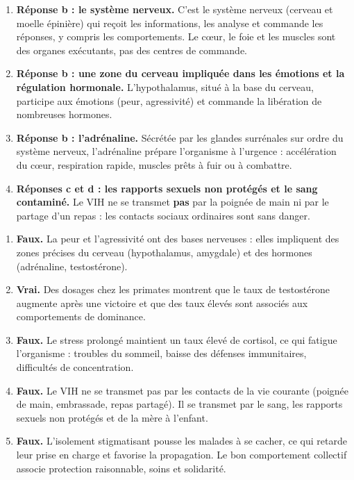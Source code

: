 \documentclass[11pt]{article}
\begin{document}
\begin{corrige}
\begin{enumerate}
\item \textbf{Réponse b : le système nerveux.} C'est le système nerveux (cerveau et moelle épinière) qui reçoit les informations, les analyse et commande les réponses, y compris les comportements. Le cœur, le foie et les muscles sont des organes exécutants, pas des centres de commande.
\item \textbf{Réponse b : une zone du cerveau impliquée dans les émotions et la régulation hormonale.} L'hypothalamus, situé à la base du cerveau, participe aux émotions (peur, agressivité) et commande la libération de nombreuses hormones.
\item \textbf{Réponse b : l'adrénaline.} Sécrétée par les glandes surrénales sur ordre du système nerveux, l'adrénaline prépare l'organisme à l'urgence : accélération du cœur, respiration rapide, muscles prêts à fuir ou à combattre.
\item \textbf{Réponses c et d : les rapports sexuels non protégés et le sang contaminé.} Le VIH ne se transmet \textbf{pas} par la poignée de main ni par le partage d'un repas : les contacts sociaux ordinaires sont sans danger.
\end{enumerate}
\end{corrige}

\begin{corrige}
\begin{enumerate}
\item \textbf{Faux.} La peur et l'agressivité ont des bases nerveuses : elles impliquent des zones précises du cerveau (hypothalamus, amygdale) et des hormones (adrénaline, testostérone).
\item \textbf{Vrai.} Des dosages chez les primates montrent que le taux de testostérone augmente après une victoire et que des taux élevés sont associés aux comportements de dominance.
\item \textbf{Faux.} Le stress prolongé maintient un taux élevé de cortisol, ce qui fatigue l'organisme : troubles du sommeil, baisse des défenses immunitaires, difficultés de concentration.
\item \textbf{Faux.} Le VIH ne se transmet pas par les contacts de la vie courante (poignée de main, embrassade, repas partagé). Il se transmet par le sang, les rapports sexuels non protégés et de la mère à l'enfant.
\item \textbf{Faux.} L'isolement stigmatisant pousse les malades à se cacher, ce qui retarde leur prise en charge et favorise la propagation. Le bon comportement collectif associe protection raisonnable, soins et solidarité.
\end{enumerate}
\end{corrige}
\end{document}
